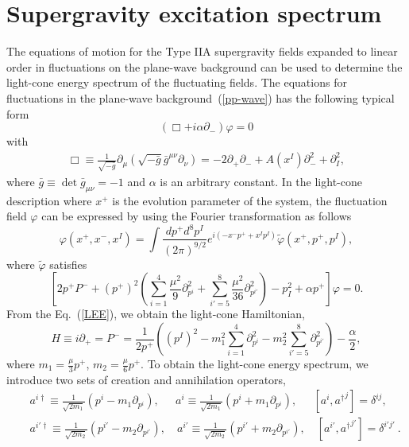 \documentclass[a4paper,12pt]{article}
\numberwithin{equation}{section}
\begin{document}
\section{Supergravity excitation spectrum}
\label{sugra}

The equations of motion for the Type IIA supergravity fields expanded
to linear order in fluctuations on the plane-wave background can be
used to determine the light-cone energy spectrum of the fluctuating
fields. The equations for fluctuations in the plane-wave
background~(\ref{pp-wave}) has the following typical form
\begin{equation}\label{seqn}
\left(\Box + i \alpha \partial_-\right)\varphi = 0
\end{equation}
with
\begin{eqnarray}\nonumber
\Box \equiv \frac{1}{\sqrt{-\bar{g}}}
\partial_\mu \left(\sqrt{-\bar{g}}
    \bar{g}^{\mu\nu}\partial_\nu  \right)
= -2 \partial_+\partial_- + A(x^I) \partial_-^2 + \partial_I^2,
\end{eqnarray}
where $\bar{g} \equiv \det \bar{g}_{\mu\nu}= -1$ and $\alpha$ is an
arbitrary constant.  In the light-cone description where $x^+$ is the
evolution parameter of the system, the fluctuation field $\varphi$ can
be expressed by using the Fourier transformation as follows
\begin{equation}
\varphi(x^+, x^-, x^I) = \int \frac{dp^+ d^8 p^I}{ ( 2\pi)^{9/2}}
e^{i ( - x^- p^+ + x^I p^I)} \tilde \varphi ( x^+, p^+, p^I),
\end{equation}
where $\tilde \varphi$ satisfies
\begin{equation} \label{LEE}
\left[ 2 p^+ P^- + (p^+)^2 \left(\sum_{i = 1}^{4}\frac{\mu^2}{9}
\partial_{p^i}^2  + \sum_{i'=5}^8 \frac{\mu^2}{36} \partial_{p^{i'}}^2
\right) - p_I^2 + \alpha p^+\right] \varphi = 0.
\end{equation}
From the Eq.~(\ref{LEE}), we obtain the light-cone Hamiltonian,
\begin{equation}\label{LE}
H \equiv i\partial_+ = P^-
       = \frac1{2p^+} \left( (p^I)^2 - m_1^2
         \sum_{i =1}^4 \partial_{p^i}^2
         - m_2^2 \sum_{i'= 5}^8\partial_{p^{i'}}^2 \right)
         - \frac{\alpha}{2},
\end{equation}
where $ m_1 = \frac{\mu}3 p^+$, $ m_2 = \frac{\mu}6 p^+$.  To obtain
the light-cone energy spectrum, we introduce two sets of creation and
annihilation operators,
\begin{eqnarray}
&& a^{i \dagger} \equiv \frac1{\sqrt{2m_1}}
    ( p^i - m_1 \partial_{p^i}),
\quad
       ~~a^i \equiv \frac1{\sqrt{2m_1}} ( p^i + m_1 \partial_{p^i}),
\quad
       ~~[a^i, {a^\dagger}^j] = \delta^{ij}, \\
&& a^{i' \dagger} \equiv \frac1{\sqrt{2m_2}}
   ( p^{i'} - m_2 \partial_{p^{i'}}),
\quad
        a^{i'} \equiv \frac1{\sqrt{2m_2}} ( p^{i'} + m_2 \partial_{p^{i'}}),
\quad
        [a^{i'}, {a^\dagger}^{j'}] = \delta^{i'j'} ~.
\end{eqnarray}
\end{document}
